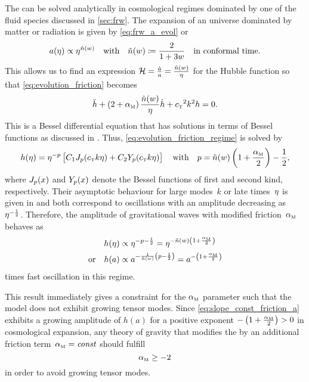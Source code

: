 The  can be solved analytically in cosmological regimes dominated by one of the fluid species discussed in \autoref{sec:frw}. The expansion of an \FLRW{} universe dominated by matter or radiation is given by \eqref{eq:frw_a_evol} or
\begin{equation}
	a(\eta) \propto \eta^{\tilde{n}(w)} \quad \text{with} \quad \tilde{n}(w) \coloneqq \frac{2}{1+3w} \quad \text{in conformal time.}
\end{equation}
This allows us to find an expression \(\mathcal{H} = \frac{\dot{a}}{a} = \frac{\tilde{n}(w)}{\eta}\) for the Hubble function so that \eqref{eq:evolution_friction} becomes
\begin{equation}\label{eq:evolution_friction_regime}
	\ddconf{h} + \del{2 + \alphaM} \frac{\nexpconft}{\conft} \dconf{h} + \cT^2 k^2 h = 0
	\eqpunct{.}
\end{equation}
This is a Bessel differential equation that has solutions in terms of Bessel functions as discussed in . Thus, \eqref{eq:evolution_friction_regime} is solved by
\begin{equation}
	h(\conft) = \conft^{-p} \sbr{C_1 \besselJ_p(\cT k \conft) + C_2 \besselY_p(\cT k \conft)} \quad \text{with} \quad p = \nexpconft\del{1 + \frac{\alphaM}{2}}-\frac{1}{2}
	\eqpunct{,}
\end{equation}
where \(J_p(x)\) and \(Y_p(x)\) denote the Bessel functions of first and second kind, respectively. Their asymptotic behaviour for large modes~\(k\) or late times~\(\eta\) is given in  and both correspond to oscillations with an amplitude decreasing as~\(\eta^{-\frac{1}{2}}\). Therefore, the amplitude of gravitational waves with modified friction~\({\alpha_{\textnormal{\tiny{M}}}}\) behaves as%
\begin{subequations}\label{eq:slope_const_friction}%
\begin{align}%
	h(\conft) &\propto \conft^{-p-\frac{1}{2}} = \conft^{-\nexpconft\del{1+\frac{\alphaM}{2}}} \\
	\text{or} \quad h(a) &\propto a^{-\frac{1}{\nexpconft}\del{p-\frac{1}{2}}} = a^{-\del{1+\frac{\alphaM}{2}}} \label{eq:slope_const_friction_a}
\end{align}
\end{subequations}
times fast oscillation in this regime.

This result immediately gives a constraint for the \({\alpha_{\textnormal{\tiny{M}}}}\) parameter such that the model does not exhibit growing tensor modes. Since \eqref{eq:slope_const_friction_a} exhibits a growing amplitude of \(h(a)\) for a positive exponent \(-\del{1+\frac{\alphaM}{2}} > 0\) in cosmological expansion, any theory of gravity that modifies the  by an additional friction term~\({\alpha_{\textnormal{\tiny{M}}}}=\textnormal{\textit{const}}\) should fulfill
\begin{equation}\label{eq:grow_cond_const_fric}
	{\alpha_{\textnormal{\tiny{M}}}} \geq -2
\end{equation}
in order to avoid growing tensor modes.

